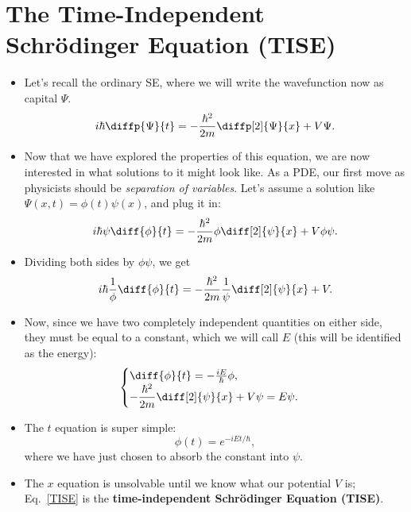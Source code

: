 \section{The Time-Independent Schr\"odinger Equation (TISE)}


\begin{itemize}
    \item Let's recall the ordinary SE, where we will write the wavefunction now as capital $\Psi$.
        \begin{equation}
            i\hbar\diffp{\Psi}{t} = -\frac{\hbar^2}{2m} \diffp[2]{\Psi}{x} + V\Psi.
        \end{equation}
    \item Now that we have explored the properties of this equation, we are now interested in what solutions to it might look like. As a PDE, our first move as physicists should be \textit{separation of variables}. Let's assume a solution like $\Psi(x,t) = \phi(t)\psi(x)$, and plug it in:
        \begin{equation}
            i\hbar \psi \diff{\phi}{t} = -\frac{\hbar^2}{2m} \phi \diff[2]{\psi}{x} + V\phi\psi.
        \end{equation}
    \item Dividing both sides by $\phi\psi$, we get
        \begin{equation}
            i\hbar \frac{1}{\phi} \diff{\phi}{t} = -\frac{\hbar^2}{2m} \frac{1}{\psi} \diff[2]{\psi}{x} + V.
        \end{equation}
    \item Now, since we have two completely independent quantities on either side, they must be equal to a constant, which we will call $E$ (this will be identified as the energy):
    \renewcommand{\arraystretch}{1.2}
        \begin{equation}
        \begin{cases}
            \diff{\phi}{t} = -\frac{iE}{\hbar} \phi, \\
            -\dfrac{\hbar^2}{2m}\diff[2]{\psi}{x} + V\psi = E\psi.\label{TISE}
        \end{cases}
        \end{equation}
    \renewcommand{\arraystretch}{1}
    \item The $t$ equation is super simple:
        \begin{equation}
            \phi(t) = e^{-iEt/\hbar},
        \end{equation}
        where we have just chosen to absorb the constant into $\psi$.
    \item The $x$ equation is unsolvable until we know what our potential $V$ is; Eq.~\eqref{TISE} is the \textbf{time-independent Schr\"odinger Equation (TISE)}.

\end{itemize}
